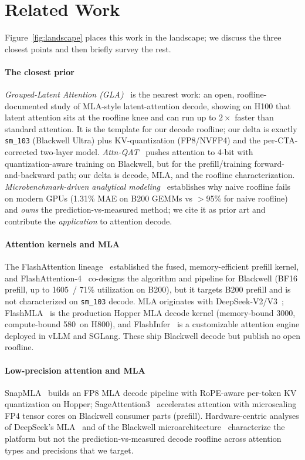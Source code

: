 \section{Related Work}
\label{sec:related}

Figure~\ref{fig:landscape} places this work in the landscape; we discuss the
three closest points and then briefly survey the rest.

\paragraph{The closest prior}
\emph{Grouped-Latent Attention (GLA)}~\cite{gla} is the nearest work: an open,
roofline-documented study of MLA-style latent-attention decode, showing on H100
that latent attention sits at the roofline knee and can run up to $2\times$ faster
than standard attention. It is the template for our decode roofline; our delta is
exactly \texttt{sm\_103} (Blackwell Ultra) plus KV-quantization (FP8/NVFP4) and
the per-CTA-corrected two-layer model.
\emph{Attn-QAT}~\cite{attnqat} pushes attention to 4-bit with quantization-aware
training on Blackwell, but for the prefill/training forward-and-backward path; our
delta is decode, MLA, and the roofline characterization.
\emph{Microbenchmark-driven analytical modeling}~\cite{roofmethod} establishes why
naive roofline fails on modern GPUs (1.31\% MAE on B200 GEMMs vs $>$95\% for naive
roofline) and \emph{owns} the prediction-vs-measured method; we cite it as prior
art and contribute the \emph{application} to attention decode.

\paragraph{Attention kernels and MLA}
The FlashAttention lineage~\cite{fa1,fa2,fa3} established the fused,
memory-efficient prefill kernel, and FlashAttention-4~\cite{fa4} co-designs the
algorithm and pipeline for Blackwell (BF16 prefill, up to 1605\tflops\ / 71\%
utilization on B200), but it targets B200 prefill and is not characterized on
\texttt{sm\_103} decode. MLA originates with DeepSeek-V2/V3~\cite{deepseekv2,%
deepseekv3}; FlashMLA~\cite{flashmla} is the production Hopper MLA decode kernel
(memory-bound 3000\gbs, compute-bound 580\tflops\ on H800), and
FlashInfer~\cite{flashinfer} is a customizable attention engine deployed in vLLM
and SGLang. These ship Blackwell decode but publish no open roofline.

\paragraph{Low-precision attention and MLA}
SnapMLA~\cite{snapmla} builds an FP8 MLA decode pipeline with RoPE-aware
per-token KV quantization on Hopper; SageAttention3~\cite{sage3} accelerates
attention with microscaling FP4 tensor cores on Blackwell consumer parts
(prefill). Hardware-centric analyses of DeepSeek's MLA~\cite{deepseekhw} and of
the Blackwell microarchitecture~\cite{blackwellubench} characterize the platform
but not the prediction-vs-measured decode roofline across attention types and
precisions that we target.
